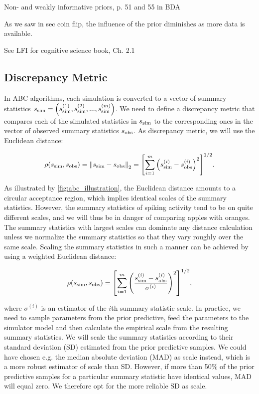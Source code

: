 Non- and weakly informative priors, p. 51 and 55 in BDA

As we saw in sec coin flip, the influence of the prior diminishes as more data is available.  


See LFI for cognitive science book, Ch. 2.1

\subsection{Discrepancy Metric}

In ABC algorithms, each simulation is converted to a vector of summary statistics $s_\mathrm{sim} = \qty(s_{\mathrm{sim}}^{(1)}, s_{\mathrm{sim}}^{(2)}, ... , s_{\mathrm{sim}}^{(m)})$. We need to define a discrepancy metric that compares each of the simulated statistics in $s_\mathrm{sim}$ to the corresponding ones in the vector of observed summary statistics $s_\mathrm{obs}$. As discrepancy metric, we will use the Euclidean distance: 

\begin{equation*}
    \rho \qty(s_\mathrm{sim}, s_\mathrm{obs} ) = \norm{s_\mathrm{sim} - s_\mathrm{obs}}_2 = \qty[\sum_{i=1}^m \qty(s_\mathrm{sim}^{(i)} - s_\mathrm{obs}^{(i)} )^2 ]^{1/2}.
\end{equation*}

As illustrated by \autoref{fig:abc_illustration}, the Euclidean distance amounts to a circular acceptance region, which implies identical scales of the summary statistics. However, the summary statistics of spiking activity tend to be on quite different scales, and we will thus be in danger of comparing apples with oranges. The summary statistics with largest scales can dominate any distance calculation unless we normalize the summary statistics so that they vary roughly over the same scale. Scaling the summary statistics in such a manner can be achieved by using a weighted Euclidean distance: 

\begin{equation*}
    \rho \qty(s_\mathrm{sim}, s_\mathrm{obs} ) = \qty[\sum_{i=1}^m \qty(\frac{s_\mathrm{sim}^{(i)} - s_\mathrm{obs}^{(i)}}{\sigma^{(i)}} )^2 ]^{1/2},
\end{equation*}

where $\sigma^{(i)}$ is an estimator of the $i$th summary statistic scale. In practice, we need to sample parameters from the prior predictive, feed the parameters to the simulator model and then calculate the empirical scale from the resulting summary statistics. We will scale the summary statistics according to their standard deviation (SD) estimated from the prior predictive samples.  We could have chosen e.g. the median absolute deviation (MAD) as scale instead, which is a more robust estimator of scale than SD. However, if more than 50\% of the prior predictive samples for a particular summary statistic have identical values, MAD will equal zero. We therefore opt for the more reliable SD as scale. 

